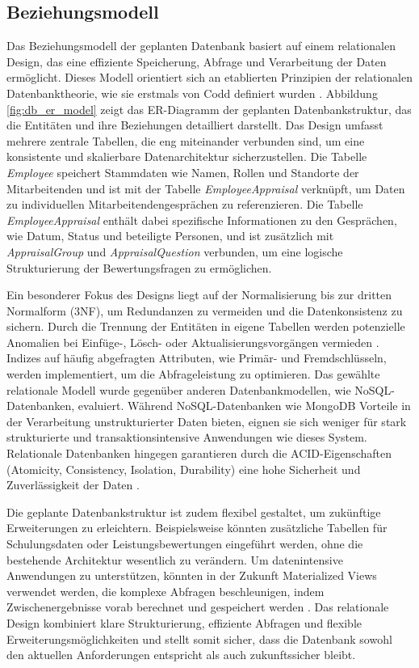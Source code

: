 \subsection{Beziehungsmodell}
Das Beziehungsmodell der geplanten Datenbank basiert auf einem relationalen Design, das eine effiziente Speicherung, Abfrage und Verarbeitung der Daten ermöglicht. Dieses Modell orientiert sich an etablierten Prinzipien der relationalen Datenbanktheorie, wie sie erstmals von Codd definiert wurden \cite{codd1970relational}. Abbildung \ref{fig:db_er_model} zeigt das ER-Diagramm der geplanten Datenbankstruktur, das die Entitäten und ihre Beziehungen detailliert darstellt. Das Design umfasst mehrere zentrale Tabellen, die eng miteinander verbunden sind, um eine konsistente und skalierbare Datenarchitektur sicherzustellen. Die Tabelle \textit{Employee} speichert Stammdaten wie Namen, Rollen und Standorte der Mitarbeitenden und ist mit der Tabelle \textit{EmployeeAppraisal} verknüpft, um Daten zu individuellen Mitarbeitendengesprächen zu referenzieren. Die Tabelle \textit{EmployeeAppraisal} enthält dabei spezifische Informationen zu den Gesprächen, wie Datum, Status und beteiligte Personen, und ist zusätzlich mit \textit{AppraisalGroup} und \textit{AppraisalQuestion} verbunden, um eine logische Strukturierung der Bewertungsfragen zu ermöglichen. 

Ein besonderer Fokus des Designs liegt auf der Normalisierung bis zur dritten Normalform (3NF), um Redundanzen zu vermeiden und die Datenkonsistenz zu sichern. Durch die Trennung der Entitäten in eigene Tabellen werden potenzielle Anomalien bei Einfüge-, Lösch- oder Aktualisierungsvorgängen vermieden \cite{elmasri2020fundamentals}. Indizes auf häufig abgefragten Attributen, wie Primär- und Fremdschlüsseln, werden implementiert, um die Abfrageleistung zu optimieren. Das gewählte relationale Modell wurde gegenüber anderen Datenbankmodellen, wie NoSQL-Datenbanken, evaluiert. Während NoSQL-Datenbanken wie MongoDB Vorteile in der Verarbeitung unstrukturierter Daten bieten, eignen sie sich weniger für stark strukturierte und transaktionsintensive Anwendungen wie dieses System. Relationale Datenbanken hingegen garantieren durch die ACID-Eigenschaften (Atomicity, Consistency, Isolation, Durability) eine hohe Sicherheit und Zuverlässigkeit der Daten \cite{stonebraker2010nosql}.

Die geplante Datenbankstruktur ist zudem flexibel gestaltet, um zukünftige Erweiterungen zu erleichtern. Beispielsweise könnten zusätzliche Tabellen für Schulungsdaten oder Leistungsbewertungen eingeführt werden, ohne die bestehende Architektur wesentlich zu verändern. Um datenintensive Anwendungen zu unterstützen, könnten in der Zukunft Materialized Views verwendet werden, die komplexe Abfragen beschleunigen, indem Zwischenergebnisse vorab berechnet und gespeichert werden \cite{gupta1995materialized}. Das relationale Design kombiniert klare Strukturierung, effiziente Abfragen und flexible Erweiterungsmöglichkeiten und stellt somit sicher, dass die Datenbank sowohl den aktuellen Anforderungen entspricht als auch zukunftssicher bleibt.

